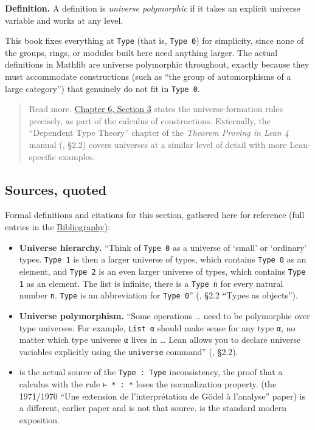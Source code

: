 \textbf{Definition.} A definition is \emph{universe polymorphic} if it takes an explicit universe variable and works at any level.

This book fixes everything at \texttt{Type} (that is, \texttt{Type 0}) for simplicity, since none of the groups, rings, or modules built here need anything larger. The actual definitions in Mathlib are universe polymorphic throughout, exactly because they must accommodate constructions (such as ``the group of automorphisms of a large category'') that genuinely do not fit in \texttt{Type 0}.

\begin{quote}
Read more. \hyperref[sec:06-rigor-check:03-typing-rules-and-safety:1]{Chapter 6, Section 3} states the universe-formation rules precisely, as part of the calculus of constructions. Externally, the ``Dependent Type Theory'' chapter of the \emph{Theorem Proving in Lean 4} manual (\cite{TPIL4}, §2.2) covers universes at a similar level of detail with more Lean-specific examples.
\end{quote}

\subsection{Sources, quoted}\label{sec:06-rigor-check:02-universes:5}

Formal definitions and citations for this section, gathered here for reference (full entries in the \hyperref[sec:root:bibliography:1]{Bibliography}):

\begin{itemize}
\tightlist
\item
  \textbf{Universe hierarchy.} ``Think of \texttt{Type 0} as a universe of `small' or `ordinary' types. \texttt{Type 1} is then a larger universe of types, which contains \texttt{Type 0} as an element, and \texttt{Type 2} is an even larger universe of types, which contains \texttt{Type 1} as an element. The list is infinite, there is a \texttt{Type n} for every natural number \texttt{n}. \texttt{Type} is an abbreviation for \texttt{Type 0}'' (\cite{TPIL4}, §2.2 ``Types as objects'').
\item
  \textbf{Universe polymorphism.} ``Some operations \ldots{} need to be polymorphic over type universes. For example, \texttt{List α} should make sense for any type \texttt{α}, no matter which type universe \texttt{α} lives in \ldots{} Lean allows you to declare universe variables explicitly using the \texttt{universe} command'' (\cite{TPIL4}, §2.2).
\item
  \cite{Girard1972} is the actual source of the \texttt{Type : Type} inconsistency, the proof that a calculus with the rule \texttt{⊢ * : *} loses the normalization property. \cite{Girard1971} (the 1971/1970 ``Une extension de l'interprétation de Gödel à l'analyse'' paper) is a different, earlier paper and is not that source. \cite{Coquand1986} is the standard modern exposition.
\end{itemize}
